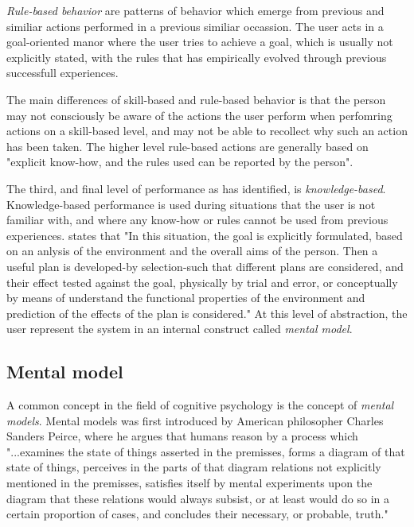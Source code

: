 \begin{enumerate}
\textit{Rule-based behavior} are patterns of behavior which emerge from previous and similiar actions performed in a previous similiar occassion. The user acts in a goal-oriented manor where the user tries to achieve a goal, which is usually not explicitly stated, with the rules that has empirically evolved through previous successfull experiences. 

The main differences of skill-based and rule-based behavior is that the person may not consciously be aware of the actions the user perform when perfomring actions on a skill-based level, and may not be able to recollect why such an action has been taken. The higher level rule-based actions are generally based on "explicit know-how, and the rules used can be reported by the person".

The third, and final level of performance as \cite{Rasmussen1983} has identified, is \textit{knowledge-based}. Knowledge-based performance is used during situations that the user is not familiar with, and where any know-how or rules cannot be used from previous experiences. \cite{Rasmussen1983} states that "In this situation, the goal is explicitly formulated, based on an anlysis of the environment and the overall aims of the person. Then a useful plan is developed-by selection-such that different plans are considered, and their effect tested against the goal, physically by trial and error, or conceptually by means of understand the functional properties of the environment and prediction of the effects of the plan is considered." At this level of abstraction, the user represent the system in an internal construct called \textit{mental model}.


\subsection{Mental model}

A common concept in the field of cognitive psychology is the concept of \textit{mental models}. Mental models was first introduced by American philosopher Charles Sanders Peirce, where he argues that humans reason by a process which
"...examines the state of things
asserted in the premisses, forms a diagram of that state of things, perceives in the parts of that diagram relations not explicitly mentioned in the premisses, satisfies itself by mental experiments upon the diagram that these relations would always subsist, or at least would do so in a certain proportion of cases, and concludes their necessary, or probable, truth." \cite{Pierce1974}


\end{enumerate}
